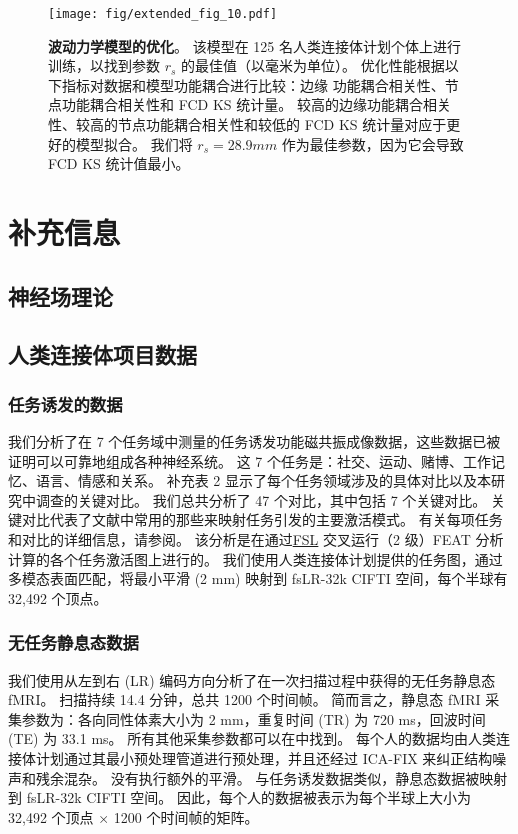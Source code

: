 \documentclass[lang=cn,a4paper,newtx]{elegantpaper}
\begin{document}
\begin{figure}[!htb] 
	\centering
	\texttt{[image: fig/extended\_fig\_10.pdf]}
	\caption{\textbf{波动力学模型的优化}。
	该模型在 125 名人类连接体计划个体上进行训练，以找到参数 $ r_s $ 的最佳值（以毫米为单位）。
	优化性能根据以下指标对数据和模型功能耦合进行比较：边缘 功能耦合相关性、节点功能耦合相关性和 FCD KS 统计量。
	较高的边缘功能耦合相关性、较高的节点功能耦合相关性和较低的 FCD KS 统计量对应于更好的模型拟合。
	我们将 $ r_s = 28.9 mm $ 作为最佳参数，因为它会导致 FCD KS 统计值最小。}
	\label{fig:extended_fig_10}
\end{figure}



\section{补充信息}

\subsection{神经场理论} \label{sec:NFT}

\subsection{人类连接体项目数据} \label{sec:sup_2}

\subsubsection{任务诱发的数据} \label{sec:sup_2_1}

我们分析了在 7 个任务域中测量的任务诱发功能磁共振成像数据，这些数据已被证明可以可靠地组成各种神经系统\cite{barch2013function}。
这 7 个任务是：社交、运动、赌博、工作记忆、语言、情感和关系。
补充表 2 显示了每个任务领域涉及的具体对比以及本研究中调查的关键对比。
我们总共分析了 47 个对比，其中包括 7 个关键对比。
关键对比代表了文献中常用的那些来映射任务引发的主要激活模式。
有关每项任务和对比的详细信息，请参阅\cite{barch2013function}。
该分析是在通过\href{https://fsl.fmrib.ox.ac.uk/}{FSL} 交叉运行（2 级）FEAT 分析\cite{woolrich2004multilevel}计算的各个任务激活图上进行的。
我们使用人类连接体计划提供的任务图，通过多模态表面匹配\cite{robinson2018multimodal}，将最小平滑 (2 mm) 映射到 fsLR-32k CIFTI 空间，每个半球有 32,492 个顶点。


\subsubsection{无任务静息态数据} \label{sec:sup_2_2}
我们使用从左到右 (LR) 编码方向分析了在一次扫描过程中获得的无任务静息态 fMRI。
扫描持续 14.4 分钟，总共 1200 个时间帧。
简而言之，静息态 fMRI 采集参数为：各向同性体素大小为 2 mm，重复时间 (TR) 为 720 ms，回波时间 (TE) 为 33.1 ms。
所有其他采集参数都可以在\cite{van2013wu}中找到。
每个人的数据均由人类连接体计划通过其最小预处理管道进行预处理\cite{glasser2013minimal}，并且还经过 ICA-FIX 来纠正结构噪声和残余混杂\cite{salimi2014automatic}。
没有执行额外的平滑。
与任务诱发数据类似，静息态数据被映射到 fsLR-32k CIFTI 空间。
因此，每个人的数据被表示为每个半球上大小为 32,492 个顶点 × 1200 个时间帧的矩阵。
\end{document}
